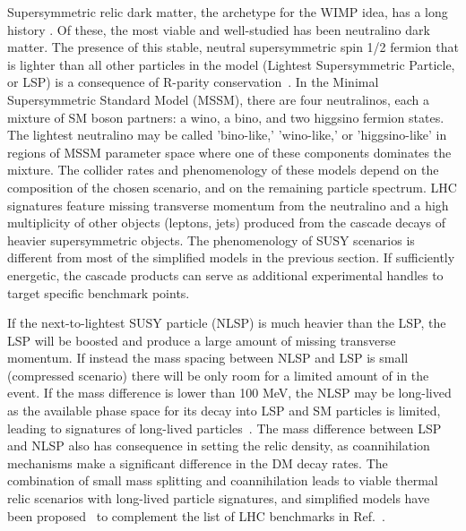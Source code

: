 Supersymmetric relic dark matter, the archetype for the WIMP idea, has a long
history \cite{doi:10.1016/0550-3213(84)90461-9}.
Of these, the most viable and well-studied has been neutralino dark matter. 
The presence of this stable, neutral supersymmetric spin 1/2 fermion that
is lighter than all other particles in the model (Lightest Supersymmetric Particle, or LSP) %
is a consequence of R-parity conservation~\cite{Farrar:1978xj}. %
In the Minimal Supersymmetric Standard Model (MSSM),
there are four neutralinos, each a mixture of SM boson partners: a wino, a bino, and two higgsino fermion states.
The lightest neutralino may be called 'bino-like,' 'wino-like,' or 'higgsino-like'
in regions of MSSM parameter space where one of these components dominates the mixture.
The collider rates and phenomenology of these models depend on the composition of the chosen scenario,
and on the remaining particle spectrum. 
LHC signatures feature missing transverse momentum from the neutralino and a high multiplicity of other objects
(leptons, jets) produced from the cascade decays of heavier supersymmetric objects. The phenomenology
of SUSY scenarios is different from most of the simplified models in the previous section. 
If sufficiently energetic, the cascade products can serve as additional experimental handles 
to target specific benchmark points. 


If the next-to-lightest SUSY particle (NLSP) is much heavier than the LSP, the LSP will be boosted and produce
a large amount of missing transverse momentum. If instead the mass spacing between NLSP and LSP is 
small (compressed scenario) there will be only room for a limited amount of \MET in the event.
If the mass difference is lower than 100 MeV, the NLSP may be long-lived as the available phase space
for its decay into LSP and SM particles is limited, %
leading to signatures of long-lived particles~\cite{Chen:1995yu}. 
The mass difference between LSP and NLSP also has consequence in setting the relic density, as
coannihilation mechanisms make a significant difference in the DM decay rates.
The combination of small mass splitting and coannihilation leads to viable thermal relic scenarios with
long-lived particle signatures, and simplified models have been proposed~\cite{Khoze:2017ixx} to complement the
list of LHC benchmarks in Ref.~\cite{Abercrombie:2015wmb}.


